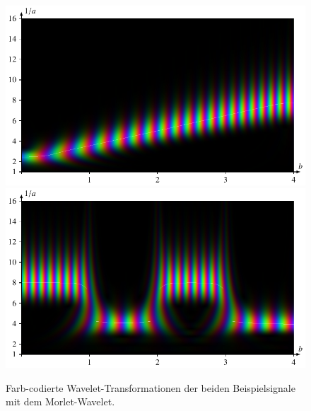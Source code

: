 \begin{figure}
	\centering
	\includegraphics{papers/complex/images/chirp_morlet.pdf}
	\includegraphics{papers/complex/images/square_morlet.pdf}
	\caption{Farb-codierte Wavelet-Transformationen der beiden Beispielsignale mit dem Morlet-Wavelet.}
	\label{complex:morlet-ex}
\end{figure}
